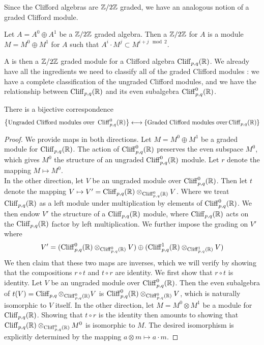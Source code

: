 Since the Clifford algebras are $\mathbb{Z}/2\mathbb{Z}$ graded, we have an analogous notion
of a graded Clifford module.
%
\begin{defn}
Let $A = A^0 \oplus A^1$ be a $\mathbb{Z}/2\mathbb{Z}$ graded algebra. Then a $\mathbb{Z}/2\mathbb{Z}$
 for $A$ is a module $M = M^0 \oplus M^1$ for $A$ such that
$A^i \cdot M^j \subset M^{i + j \mod 2}$.
\end{defn}
%
A  is then a $\mathbb{Z}/2\mathbb{Z}$ graded module for a Clifford
algebra $\operatorname{Cliff}_{p,q}(\mathbb{R})$. We already have all the ingredients we need
to classify all of the graded Clifford modules : we have a complete
classification of the ungraded Clifford modules, and we have the relationship
between $\operatorname{Cliff}_{p,q}(\mathbb{R})$ and its even subalgebra $\operatorname{Cliff}_{p,q}^0(\mathbb{R})$.
%
\begin{thm}
There is a bijective correspondence
\[
\left\lbrace \text{Ungraded Clifford modules over } \operatorname{Cliff}_{p,q}^0(\mathbb{R}) \right\rbrace \longleftrightarrow
\left\lbrace \text{Graded Clifford modules over} \operatorname{Cliff}_{p,q}(\mathbb{R}) \right\rbrace
\]
\end{thm}
%
\begin{proof}
We provide maps in both directions. Let $M = M^0 \oplus M^1$ be a graded
module for $\operatorname{Cliff}_{p,q}(\mathbb{R})$. The action of $\operatorname{Cliff}_{p,q}^0(\mathbb{R})$ preserves
the even subspace $M^0$, which gives $M^0$ the structure of an ungraded
$\operatorname{Cliff}_{p,q}^0(\mathbb{R})$ module. Let $r$ denote the mapping $M \mapsto M^0$. \\

In the other direction, let $V$ be an ungraded module over $\operatorname{Cliff}_{p,q}^0(\mathbb{R})$.
Then let $t$ denote the mapping
$V \mapsto V' = \operatorname{Cliff}_{p,q}(\mathbb{R}) \otimes_{\operatorname{Cliff}_{p,q}^0(\mathbb{R})} V$.
Where we treat $\operatorname{Cliff}_{p,q}(\mathbb{R})$ as a left module under multiplication by
elements of $\operatorname{Cliff}_{p,q}^0(\mathbb{R})$. We then endow $V'$ the structure of a
$\operatorname{Cliff}_{p,q}(\mathbb{R})$ module, where $\operatorname{Cliff}_{p,q}(\mathbb{R})$ acts on the $\operatorname{Cliff}_{p,q}(\mathbb{R})$
factor by left multiplication. We further impose the grading on $V'$ where
\[
V' = ( \operatorname{Cliff}^0_{p,q}(\mathbb{R}) \otimes_{\operatorname{Cliff}^0_{p,q}(\mathbb{R})} V) \oplus
(\operatorname{Cliff}^1_{p,q}(\mathbb{R}) \otimes_{\operatorname{Cliff}^1_{p,q}(\mathbb{R})} V)
\]
We then claim that these two maps are inverses, which we will verify by showing
that the compositions $r \circ t$ and $t \circ r$ are identity. We first show
that $r \circ t$ is identity. Let $V$ be an ungraded module over $\operatorname{Cliff}_{p,q}^0(\mathbb{R})$.
Then the even subalgebra of $t(V) = \operatorname{Cliff}_{p,q} \otimes_{\operatorname{Cliff}_{p,q}^0(\mathbb{R})} V$
is $\operatorname{Cliff}^0_{p,q}(\mathbb{R}) \otimes_{\operatorname{Cliff}^0_{p,q}(\mathbb{R})} V$, which is naturally isomorphic
to $V$ itself. In the other direction, let $M = M^0 \otimes M^1$ be a module for
$\operatorname{Cliff}_{p,q}(\mathbb{R})$. Showing that $t \circ r$ is the identity then amounts to showing
that $\operatorname{Cliff}_{p,q}(\mathbb{R}) \otimes_{\operatorname{Cliff}_{p,q}^0(\mathbb{R})} M^0$ is isomorphic to $M$.
The desired isomorphism is explicitly determined by the mapping
$a \otimes m \mapsto a \cdot m$.
\end{proof}
